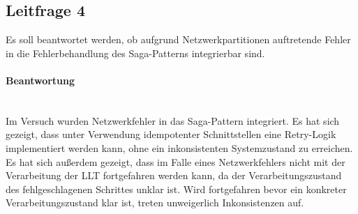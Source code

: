 \subsection{Leitfrage 4}

Es soll beantwortet werden, ob aufgrund Netzwerkpartitionen auftretende Fehler in die Fehlerbehandlung des Saga-Patterns integrierbar sind. 

\paragraph*{Beantwortung} \mbox{} \\
Im Versuch wurden Netzwerkfehler in das Saga-Pattern integriert. Es hat sich gezeigt, dass unter Verwendung idempotenter Schnittstellen eine Retry-Logik implementiert werden kann, ohne ein inkonsistenten Systemzustand zu erreichen. Es hat sich außerdem gezeigt, dass im Falle eines Netzwerkfehlers nicht mit der Verarbeitung der LLT fortgefahren werden kann, da der Verarbeitungszustand des fehlgeschlagenen Schrittes unklar ist. Wird fortgefahren bevor ein konkreter Verarbeitungszustand klar ist, treten unweigerlich Inkonsistenzen auf. 